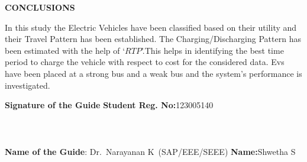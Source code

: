 	
	\begin{center}
		\Large{{\textbf{CONCLUSIONS}}}
	\end{center}
	
	In this study the Electric Vehicles have been classified based on their utility and their Travel Pattern has been established.  The Charging/Discharging Pattern has been estimated with the help of `$RTP$'.This helps in identifying the best time period to charge the vehicle with respect to cost for the considered data. Evs have been placed at a strong bus and a weak bus and the system's performance is investigated.
	
	\vspace*{24pt}
	
		\noindent \textbf{Signature of the Guide} \hspace*{71mm} \textbf{Student Reg. No:}123005140\\
			\\
		\\
		\\
	\noindent \textbf{Name of the Guide}:{ Dr.~Narayanan K}~(SAP/EEE/SEEE) \hspace*{15mm} \textbf{Name:}Shwetha S
	\pagebreak
	\pagebreak
	
	
